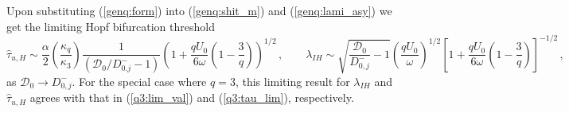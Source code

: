 \documentclass{article}%
\begin{document}
Upon substituting (\ref{genq:form}) into (\ref{genq:shit_m}) and
(\ref{genq:lami_asy}) we get the limiting Hopf bifurcation threshold
\begin{equation}\label{genq:asy_bto3}
  \hat{\tau}_{u,H}\sim \frac{\alpha}{2} \left( \frac{\kappa_q}{\kappa_3}\right)
   \frac{1}{\left({{\mathcal D}_0/D^{-}_{0.j}} -1\right)} 
 \left( 1 + \frac{qU_0}{6\omega} \left(1 - \frac{3}{q}\right) \right)^{1/2} \,,
 \qquad
  \lambda_{IH}\sim \sqrt{ \frac{{\mathcal D}_0}{D^{-}_{0,j}}-1 }
   \left( \frac{qU_0}{\omega} \right)^{1/2} 
   \left[ 1 + \frac{qU_0}{6\omega}
   \left(1 - \frac{3}{q}\right) \right]^{-1/2} \,,
\end{equation}
as ${\mathcal D}_0\to D^{-}_{0,j}$.  For the special case where $q=3$,
this limiting result for $\lambda_{IH}$ and $\hat{\tau}_{u,H}$ agrees with
that in (\ref{q3:lim_val}) and (\ref{q3:tau_lim}), respectively.
\end{document}

